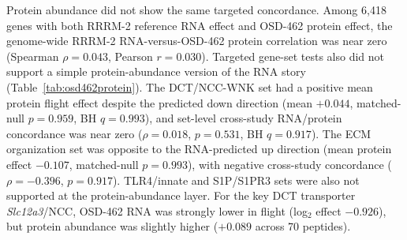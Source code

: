 \documentclass[11pt]{article}
\newcommand{\gene}[1]{\textit{#1}}
\begin{document}
Protein abundance did not show the same targeted concordance. Among 6,418 genes with both RRRM-2 reference RNA effect and OSD-462 protein effect, the genome-wide RRRM-2 RNA-versus-OSD-462 protein correlation was near zero (Spearman $\rho=0.043$, Pearson $r=0.030$). Targeted gene-set tests also did not support a simple protein-abundance version of the RNA story (Table~\ref{tab:osd462protein}). The DCT/NCC-WNK set had a positive mean protein flight effect despite the predicted down direction (mean $+0.044$, matched-null $p=0.959$, BH $q=0.993$), and set-level cross-study RNA/protein concordance was near zero ($\rho=0.018$, $p=0.531$, BH $q=0.917$). The ECM organization set was opposite to the RNA-predicted up direction (mean protein effect $-0.107$, matched-null $p=0.993$), with negative cross-study concordance ($\rho=-0.396$, $p=0.917$). TLR4/innate and S1P/S1PR3 sets were also not supported at the protein-abundance layer. For the key DCT transporter \gene{Slc12a3}/NCC, OSD-462 RNA was strongly lower in flight (log$_2$ effect $-0.926$), but protein abundance was slightly higher ($+0.089$ across 70 peptides).

\begin{table}[H]
\centering\small
{}
\caption{\textbf{OSD-462 protein-abundance concordance tests.} Matched-null $p$ values compare each observed statistic against 10,000 abundance- and peptide-matched random gene sets. BH correction across the four targeted families yielded no supported protein-abundance concordance; broad tubular transport is shown as a specificity control.}
\label{tab:osd462protein}
\end{table}
\end{document}
